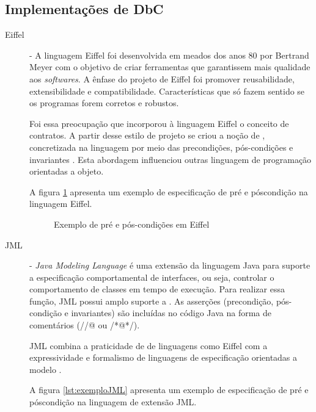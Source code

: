 \subsection{Implementações de DbC}
\label{implementDbC}

\begin{description}
\item[Eiffel] - A linguagem Eiffel foi desenvolvida em meados dos anos 80 por
Bertrand Meyer \cite{meyer1988eiffel} com o objetivo de criar ferramentas que
garantissem mais qualidade aos \textit{softwares}. A ênfase do projeto de
Eiffel foi promover reusabilidade, extensibilidade e compatibilidade.
Características que só fazem sentido se os programas forem corretos e
robustos.

Foi essa preocupação que incorporou à linguagem Eiffel o conceito de contratos.
A partir desse estilo de projeto se criou a noção de \designbycontract{},
concretizada na linguagem por meio das precondições, pós-condições e invariantes
\cite{meyer1988eiffel}. Esta abordagem influenciou outras linguagem de programação orientadas a objeto.

A figura \ref{lst:exemploEiffel} apresenta um exemplo de especificação de pré e
póscondição na linguagem Eiffel.

\vspace{6mm}

\begin{figure}[h]
\begin{small}

\vspace{-.5cm}
\end{small}
\caption{Exemplo de pré e pós-condições em Eiffel}
\label{lst:exemploEiffel}
\end{figure}


\item[JML] - \textit{Java Modeling Language} é uma extensão da linguagem Java
para suporte a especificação comportamental de interfaces, ou seja, controlar o
comportamento de classes em tempo de execução. Para realizar essa função, JML
possui amplo suporte a \designbycontract{}. As asserções (precondição,
pós-condição e invariantes) são incluídas no código Java na forma de comentários
(//@ ou /*@\ldots@*/).

JML combina a praticidade de \designbycontract{} de linguagens como Eiffel com a
expressividade e formalismo de linguagens de especificação orientadas a modelo
\cite{leavens2006design}. 

A figura \ref{lst:exemploJML} apresenta um exemplo de especificação de pré e
póscondição na linguagem de extensão JML.


\end{description}
